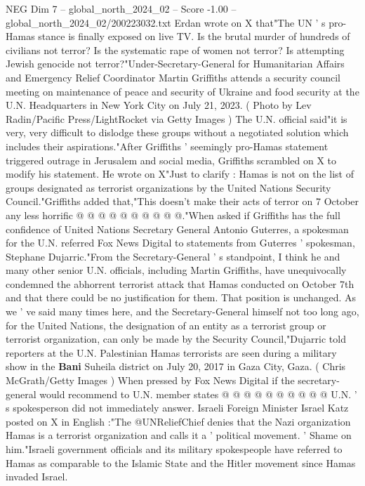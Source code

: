 \begin{textsample}{NEG Dim 7 – global\_north\_2024\_02 – Score -1.00 – global\_north\_2024\_02/200223032.txt}  \label{ex:f7_neg_428}
Erdan wrote on X that"The UN ' s pro-Hamas stance is finally exposed on live TV.
Is the brutal murder of hundreds of civilians not terror?
Is the systematic rape of women not terror?
Is attempting Jewish genocide not terror?"Under-Secretary-General for Humanitarian Affairs and Emergency Relief Coordinator Martin Griffiths attends a security council meeting on maintenance of peace and security of Ukraine and food security at the U.N.
Headquarters in New York City on July 21, 2023. ( Photo by Lev Radin/Pacific Press/LightRocket via Getty Images ) The U.N. official said"it is very, very difficult to dislodge these groups without a negotiated solution which includes their aspirations."After Griffiths ' seemingly pro-Hamas statement triggered outrage in Jerusalem and social media, Griffiths scrambled on X to modify his statement.
He wrote on X"Just to clarify : Hamas is not on the list of groups designated as terrorist organizations by the United Nations Security Council."Griffiths added that,"This doesn't make their acts of terror on 7 October any less horrific @ @ @ @ @ @ @ @ @ @."When asked if Griffiths has the full confidence of United Nations Secretary General Antonio Guterres, a spokesman for the U.N. referred Fox News Digital to statements from Guterres ' spokesman, Stephane Dujarric."From the Secretary-General ' s standpoint, I think he and many other senior U.N. officials, including Martin Griffiths, have unequivocally condemned the abhorrent terrorist attack that Hamas conducted on October 7th and that there could be no justification for them.
That position is unchanged.
As we ' ve said many times here, and the Secretary-General himself not too long ago, for the United Nations, the designation of an entity as a terrorist group or terrorist organization, can only be made by the Security Council,"Dujarric told reporters at the U.N.
Palestinian Hamas terrorists are seen during a military show in the \textbf{Bani} Suheila district on July 20, 2017 in Gaza City, Gaza. ( Chris McGrath/Getty Images ) When pressed by Fox News Digital if the secretary-general would recommend to U.N. member states @ @ @ @ @ @ @ @ @ @ U.N. ' s spokesperson did not immediately answer.
Israeli Foreign Minister Israel Katz posted on X in English :"The @UNReliefChief denies that the Nazi organization Hamas is a terrorist organization and calls it a ' political movement. ' Shame on him."Israeli government officials and its military spokespeople have referred to Hamas as comparable to the Islamic State and the Hitler movement since Hamas invaded Israel.

\end{textsample}
